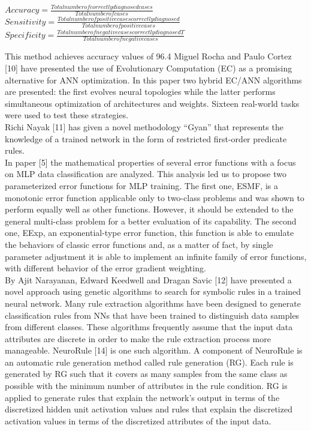 \documentclass[a4paper,14pt,onecolumn]{article}
\begin{document}
\begin{center}
$Accuracy=\frac{Total number  of  correctly diagnosed cases}{Total number of cases}$\\[4mm]

$Sensitivity=\frac{Total number of positive cases correctly diagnosed}{Total number of positive cases }$\\[4mm]

$Specificity=\frac{Total number of negative cases correctly diagnosed T}{Total number of negative cases}$\\[4mm]
\end{center}
     This method achieves accuracy values of 96.4%
     Miguel Rocha and Paulo Cortez [10] have presented the use of Evolutionary Computation (EC) as a promising alternative for ANN optimization. In this paper two hybrid EC/ANN algorithms are presented: the first evolves neural topologies while the latter performs simultaneous optimization of architectures and weights. Sixteen real-world tasks were used to test these strategies. \\
      Richi Nayak [11] has given a novel methodology “Gyan” that represents the knowledge of a trained network in the form of restricted first-order predicate rules. \\
      In paper [5] the mathematical properties of several error functions with a focus on MLP data classification are analyzed. This analysis led us to propose two parameterized error functions for MLP training. The first one, ESMF, is a monotonic error function applicable only to two-class problems and was shown to perform equally well as other functions. However, it should be extended to the general multi-class problem for a better evaluation of its capability. The second one, EExp, an exponential-type error function, this function is able to emulate the behaviors of classic error functions and, as a matter of fact, by single parameter adjustment it is able to implement an infinite family of error functions, with different behavior of the error gradient weighting.\\
       By Ajit Narayanan, Edward Keedwell and Dragan Savic [12] have presented a novel approach using genetic algorithms to search for symbolic rules in a trained neural network.       Many rule extraction algorithms have been designed to generate classification rules from NNs that have been trained to distinguish data samples from different classes. These algorithms frequently assume that the input data attributes are discrete in order to make the rule extraction process more manageable. NeuroRule [14] is one such algorithm. A component of NeuroRule is an automatic rule generation method called rule generation (RG). Each rule is generated by RG such that it covers as many samples from the same class as possible with the minimum number of attributes in the rule condition. RG is applied to generate rules that explain the network’s output in terms of the discretized hidden unit activation values and rules that explain the discretized activation values in terms of the discretized attributes of the input data.\\
\end{document}
